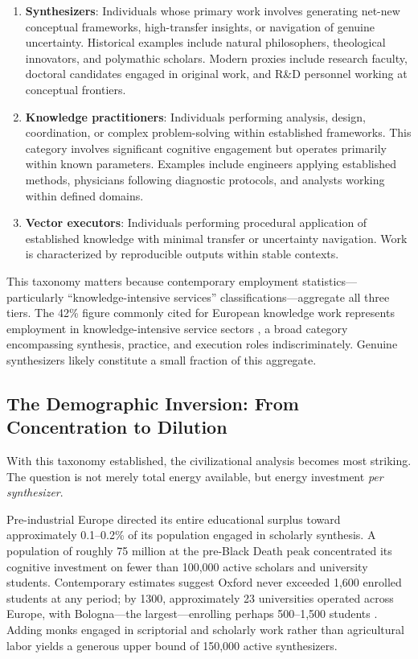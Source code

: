 \begin{enumerate}
    \item \textbf{Synthesizers}: Individuals whose primary work involves generating net-new conceptual frameworks, high-transfer insights, or navigation of genuine uncertainty. Historical examples include natural philosophers, theological innovators, and polymathic scholars. Modern proxies include research faculty, doctoral candidates engaged in original work, and R\&D personnel working at conceptual frontiers.
    
    \item \textbf{Knowledge practitioners}: Individuals performing analysis, design, coordination, or complex problem-solving within established frameworks. This category involves significant cognitive engagement but operates primarily within known parameters. Examples include engineers applying established methods, physicians following diagnostic protocols, and analysts working within defined domains.
    
    \item \textbf{Vector executors}: Individuals performing procedural application of established knowledge with minimal transfer or uncertainty navigation. Work is characterized by reproducible outputs within stable contexts.
\end{enumerate}

This taxonomy matters because contemporary employment statistics---particularly ``knowledge-intensive services'' classifications---aggregate all three tiers. The 42\% figure commonly cited for European knowledge work represents employment in knowledge-intensive service sectors \citep{eurostat2024}, a broad category encompassing synthesis, practice, and execution roles indiscriminately. Genuine synthesizers likely constitute a small fraction of this aggregate.

\subsection{The Demographic Inversion: From Concentration to Dilution}

With this taxonomy established, the civilizational analysis becomes most striking. The question is not merely total energy available, but energy investment \textit{per synthesizer}.

Pre-industrial Europe directed its entire educational surplus toward approximately 0.1--0.2\% of its population engaged in scholarly synthesis. A population of roughly 75 million at the pre-Black Death peak \citep{urlanis1941} concentrated its cognitive investment on fewer than 100,000 active scholars and university students. Contemporary estimates suggest Oxford never exceeded 1,600 enrolled students at any period; by 1300, approximately 23 universities operated across Europe, with Bologna---the largest---enrolling perhaps 500--1,500 students \citep{rashdall1936}. Adding monks engaged in scriptorial and scholarly work rather than agricultural labor yields a generous upper bound of 150,000 active synthesizers.

